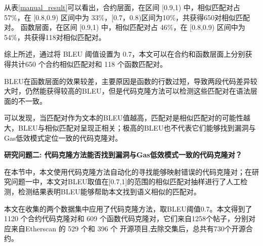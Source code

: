 从表\ref{manual_result}可以看出，合约层面，在区间 [0.9,1) 中，相似匹配对占 57\%，在 [0.8,0.9) 区间中为 33\%，[0.7，0.8)区间为10\%，共获得650对相似匹配对。
函数层面，在区间 [0.9,1) 中，相似匹配对占 46\%，在 [0.8,0.9) 区间中为 54\%，共获得118对相似匹配对。

综上所述，通过将 BLEU 阈值设置为 0.7，本文可以在合约和函数层面上分别获得共计650 个合约相似匹配对和 118 个函数匹配对。

BLEU在函数层面的效果较差，主要原因是函数的行数过短，导致两段代码差异较大时，仍然能获得较高的BLEU，但是代码克隆方法可以检测这些匹配对在语法层面的不一致。

可以发现，当匹配对作为文本的BLEU值越高，匹配对是相似匹配对的可能性越大，BLEU与相似匹配对呈现正相关；极高的BLEU也不代表它们能够找到漏洞与Gas低效模式定位一致的代码克隆对。

\textbf{研究问题二: 代码克隆方法能否找到漏洞与Gas低效模式一致的代码克隆对？}

在本节中，本文使用代码克隆方法自动化的寻找能够映射错误的代码克隆对；在研究问题一中，本文对BLEU取值在[0.7,1]的范围的相似匹配对抽样进行了人工检测，检测结果表明BLEU能够帮助本文找到语义相似的匹配对。

本文在收集的两个数据集中应用了代码克隆方法，取BLEU阈值0.7。本文得到了 1120 个合约代码克隆对和 609 个函数代码克隆对，它们来自1258个帖子，分别对应来自Etherscan 的 529 个和 396 个 开源项目,去除交集后，总共有730个开源合约。






